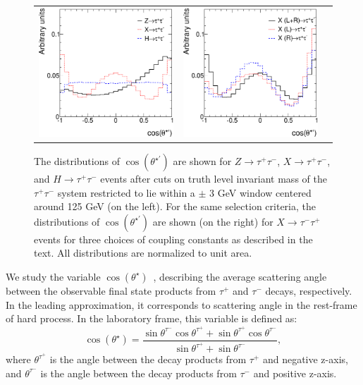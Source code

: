 \documentclass[12pt]{article}
\begin{document}
\begin{figure}[htp!]
\begin{tabular}{ccc}
\includegraphics[width=0.48\columnwidth]{hall_cstarp_cutt.eps} & 
\includegraphics[width=0.48\columnwidth]{Xtautau_0LR_8TeV_cstarp_cutt.eps} 
\end{tabular}
\caption{The distributions of $\cos(\theta^{\star\prime})$ are shown for $Z\to\tau^+\tau^-$,  $X\to\tau^+\tau^-$, and $H\to\tau^+\tau^-$ events 
after cuts on truth level invariant mass of the $\tau^+\tau^-$ system restricted to lie within a $\pm$ 3 GeV window centered around 125 GeV (on the left).
For the same selection criteria, the distributions of $\cos(\theta^{\star\prime})$ are shown (on the right) 
for $X\to\tau^-\tau^+$ events for three choices of coupling constants as described in the text.
All distributions are normalized to unit area.
}
\label{Cstarprime_ZXH}
\end{figure}

We study the variable $\cos(\theta^\star)$~\cite{Was:1989ce},
describing the average scattering angle between the observable final state products from $\tau^+$ and $\tau^-$ decays, respectively.
In the leading approximation, it corresponds to scattering angle in the rest-frame of hard process.
In the laboratory frame, this variable is defined as:
\begin{equation}
\cos(\theta^\star)= \frac{\sin\theta^{\tau^-}\cos\theta^{\tau^+} + \sin\theta^{\tau^+}\cos\theta^{\tau^-} }{\sin\theta^{\tau^+}+ \sin\theta^{\tau^-} },
\end{equation}
where $\theta^{\tau^+}$ is the angle between the decay products from $\tau^+$ and negative z-axis,
and $\theta^{\tau^-}$ is the angle between the  decay products from $\tau^-$ and positive z-axis.
\end{document}
